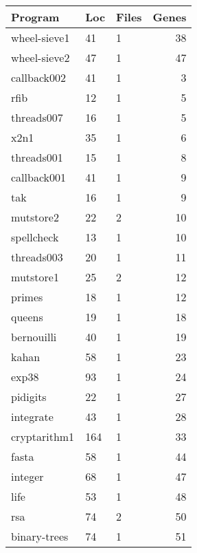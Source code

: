 \begin{table}[!htb]
    \begin{minipage}{.5\linewidth}
      \centering
        \begin{tabular}{lllr}
            \hline
            Program    &   Loc    &   Files   &   Genes\\
            \hline
            wheel-sieve1&   41  &   1   &   38\\
            wheel-sieve2&   47  &   1   &   47\\
            callback002 &   41  &   1   &   3\\ 
            rfib        &   12  &   1   &   5\\
            threads007  &   16  &   1   &   5\\
            x2n1        &   35  &   1   &   6\\
            threads001  &   15  &   1   &   8\\
            callback001 &   41  &   1   &   9\\ 
            tak         &   16  &   1   &   9\\
            mutstore2   &   22  &   2   &   10\\
            spellcheck  &   13  &   1   &   10\\
            threads003  &   20  &   1   &   11\\
            mutstore1   &   25  &   2   &   12\\
            primes      &   18  &   1   &   12\\
            queens      &   19  &   1   &   18\\
            bernouilli  &   40  &   1   &   19\\
            kahan       &   58  &   1   &   23\\
            exp38       &   93  &   1   &   24\\
            pidigits    &   22  &   1   &   27\\
            integrate   &   43  &   1   &   28\\
            cryptarithm1&   164 &   1   &   33\\
            fasta       &   58  &   1   &   44\\
            integer     &   68  &   1   &   47\\
            life        &   53  &   1   &   48\\
            rsa         &   74  &   2   &   50\\
            binary-trees&   74  &   1   &   51\\

\end{tabular}
\end{minipage}
\end{table}
